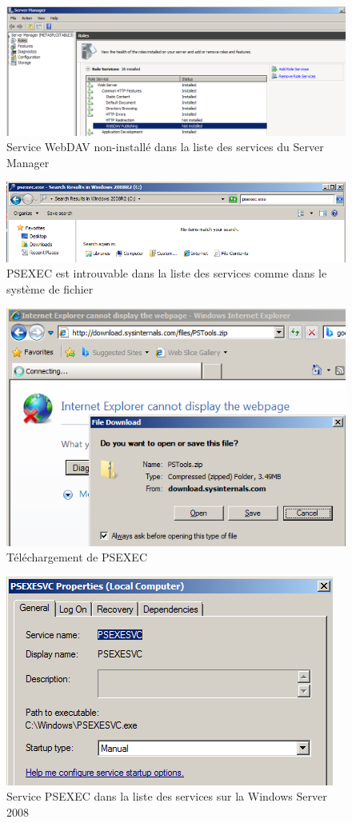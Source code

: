 \documentclass[a4paper]{article}
\begin{document}
\begin{figure}[H]
    \centering
    \includegraphics[width=0.95\linewidth]{images/zabbix-63.png}
    \caption{Service WebDAV non-installé dans la liste des services du Server Manager}
    \label{fig:zabbix63}
\end{figure}
\begin{figure}[H]
    \centering
    \includegraphics[width=0.95\linewidth]{images/zabbix-45.png}
    \caption{PSEXEC est introuvable dans la liste des services comme dans le système de fichier}
    \label{fig:zabbix45}
\end{figure}
\begin{figure}[H]
    \centering
    \includegraphics[width=0.75\linewidth]{images/zabbix-51.png}
    \caption{Téléchargement de PSEXEC}
    \label{fig:zabbix51}
\end{figure}
\begin{figure}[H]
    \centering
    \includegraphics[width=0.50\linewidth]{images/zabbix-52.png}
    \caption{Service PSEXEC dans la liste des services sur la Windows Server 2008}
    \label{fig:zabbix52}
\end{figure}
\end{document}
